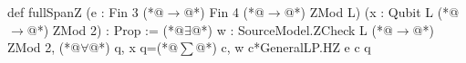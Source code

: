 def fullSpanZ (e : Fin 3 (*@$\to$@*) Fin 4 (*@$\to$@*) ZMod L) (x : Qubit L (*@$\to$@*) ZMod 2) : Prop :=
  (*@$\exists$@*) w : SourceModel.ZCheck L (*@$\to$@*) ZMod 2, (*@$\forall$@*) q, x q=(*@$\sum$@*) c, w c*GeneralLP.HZ e c q
